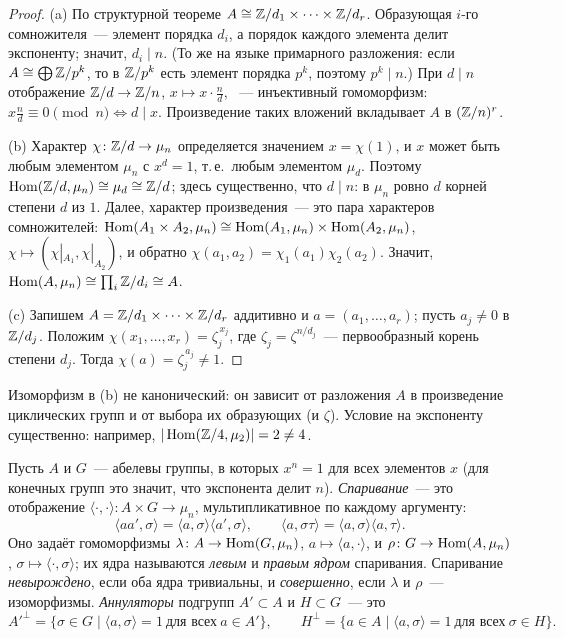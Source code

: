\begin{proof}
(a) По структурной теореме $A\cong\mathbb Z/d_1\times\dots\times\mathbb Z/d_r$. Образующая $i$-го сомножителя~--- элемент порядка
$d_i$, а порядок каждого элемента делит экспоненту; значит, $d_i\mid n$. (То же на языке примарного разложения: если
$A\cong\bigoplus\mathbb Z/p^{k}$, то в $\mathbb Z/p^k$ есть элемент порядка $p^k$, поэтому $p^k\mid n$.) При $d\mid n$ отображение
$\mathbb Z/d\to\mathbb Z/n$, $x\mapsto x\cdot\frac nd$, ~--- инъективный гомоморфизм: $x\frac nd\equiv0\pmod n\iff d\mid x$.
Произведение таких вложений вкладывает $A$ в $(\mathbb Z/n)^r$.

(b) Характер $\chi\colon\mathbb Z/d\to\mu_n$ определяется значением $x=\chi(1)$, и $x$ может быть любым элементом $\mu_n$ с
$x^d=1$, т.\,е.\ любым элементом $\mu_d$. Поэтому $\operatorname{Hom}(\mathbb Z/d,\mu_n)\cong\mu_d\cong\mathbb Z/d$; здесь существенно, что
$d\mid n$: в $\mu_n$ ровно $d$ корней степени $d$ из $1$. Далее, характер произведения~--- это пара характеров
сомножителей: $\operatorname{Hom}(A_1\times A_2,\mu_n)\cong\operatorname{Hom}(A_1,\mu_n)\times\operatorname{Hom}(A_2,\mu_n)$, $\chi\mapsto(\chi|_{A_1},\chi|_{A_2})$,
и обратно $\chi(a_1,a_2)=\chi_1(a_1)\chi_2(a_2)$. Значит, $\operatorname{Hom}(A,\mu_n)\cong\prod_i\mathbb Z/d_i\cong A$.

(c) Запишем $A=\mathbb Z/d_1\times\dots\times\mathbb Z/d_r$ аддитивно и $a=(a_1,\dots,a_r)$; пусть $a_j\ne0$ в $\mathbb Z/d_j$. Положим
$\chi(x_1,\dots,x_r)=\zeta_j^{\,x_j}$, где $\zeta_j=\zeta^{n/d_j}$~--- первообразный корень степени $d_j$. Тогда
$\chi(a)=\zeta_j^{\,a_j}\ne1$.
\end{proof}

Изоморфизм в (b) не канонический: он зависит от разложения $A$ в произведение циклических групп и от выбора их
образующих (и $\zeta$). Условие на экспоненту существенно: например, $|\operatorname{Hom}(\mathbb Z/4,\mu_2)|=2\ne4$.

\begin{definition}[5.30b]
Пусть $A$ и $G$~--- абелевы группы, в которых $x^n=1$ для всех элементов $x$ (для конечных групп это значит, что
экспонента делит $n$). \emph{Спаривание}~--- это отображение
$\langle\cdot,\cdot\rangle\colon A\times G\to\mu_n$, мультипликативное по каждому аргументу:
\[
\langle aa',\sigma\rangle=\langle a,\sigma\rangle\langle a',\sigma\rangle,\qquad
\langle a,\sigma\tau\rangle=\langle a,\sigma\rangle\langle a,\tau\rangle.
\]
Оно задаёт гомоморфизмы $\lambda\colon A\to\operatorname{Hom}(G,\mu_n)$, $a\mapsto\langle a,\cdot\rangle$, и
$\rho\colon G\to\operatorname{Hom}(A,\mu_n)$, $\sigma\mapsto\langle\cdot,\sigma\rangle$; их ядра называются \emph{левым} и \emph{правым
ядром} спаривания. Спаривание \emph{невырождено}, если оба ядра тривиальны, и \emph{совершенно}, если $\lambda$ и
$\rho$~--- изоморфизмы. \emph{Аннуляторы} подгрупп $A'\subset A$ и $H\subset G$~--- это
\[
A'^{\perp}=\{\sigma\in G\mid\langle a,\sigma\rangle=1\ \text{для всех}\ a\in A'\},\qquad
H^{\perp}=\{a\in A\mid\langle a,\sigma\rangle=1\ \text{для всех}\ \sigma\in H\}.
\]
\end{definition}

